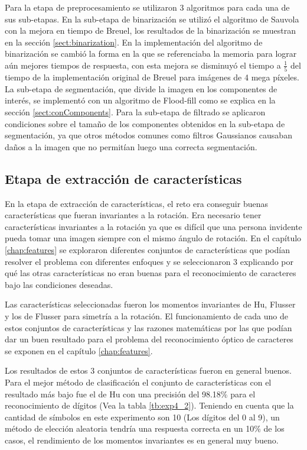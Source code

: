 \documentclass[a4paper, 11pt, oneside]{report}
\begin{document}
Para la etapa de preprocesamiento se utilizaron 3 algoritmos para cada una de sus sub-etapas. En la sub-etapa de binarización se utilizó el algoritmo de Sauvola con la mejora en tiempo de Breuel, los resultados de la binarización se muestran en la sección \ref{sect:binarization}. En la implementación del algoritmo de binarización se cambió la forma en la que se referenciaba la memoria para lograr aún mejores tiempos de respuesta, con esta mejora se disminuyó el tiempo a $\frac{1}{5}$ del tiempo de la implementación original de Breuel para imágenes de 4 mega píxeles. %
La sub-etapa de segmentación, que divide la imagen en los componentes de interés, se implementó con un algoritmo de Flood-fill como se explica en la sección \ref{sect:conComponents}. Para la sub-etapa de filtrado se aplicaron condiciones sobre el tamaño de los componentes obtenidos en la sub-etapa de segmentación, ya que otros métodos comunes como filtros Gaussianos causaban daños a la imagen que no permitían luego una correcta segmentación.

\subsection{Etapa de extracción de características}

En la etapa de extracción de características, el reto era conseguir buenas características que fueran invariantes a la rotación. Era necesario tener características invariantes a la rotación ya que es difícil que una persona invidente pueda tomar una imagen siempre con el mismo ángulo de rotación. En el capítulo \ref{chap:features} se exploraron diferentes conjuntos de características que podían resolver el problema con diferentes enfoques y se seleccionaron 3 explicando por qué las otras características no eran buenas para el reconocimiento de caracteres bajo las condiciones deseadas. 

Las características seleccionadas fueron los momentos invariantes de Hu, Flusser y los de Flusser para simetría a la rotación. El funcionamiento de cada uno de estos conjuntos de características y las razones matemáticas por las que podían dar un buen resultado para el problema del reconocimiento óptico de caracteres se exponen en el capítulo \ref{chap:features}.

Los resultados de estos 3 conjuntos de características fueron en general buenos. Para el mejor método de clasificación el conjunto de características con el resultado más bajo fue el de Hu con una precisión del 98.18\% para el reconocimiento de dígitos (Vea la tabla \ref{tb:exp4_2}). Teniendo en cuenta que la cantidad de símbolos en este experimento son 10 (Los dígitos del 0 al 9), un método de elección aleatoria tendría una respuesta correcta en un 10\% de los casos, el rendimiento de los momentos invariantes es en general muy bueno.
\end{document}

